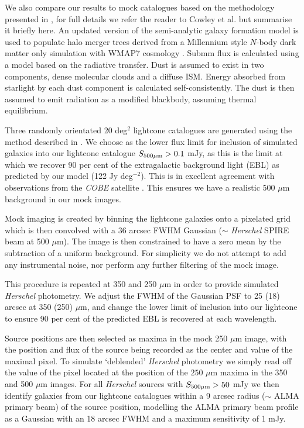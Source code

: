 We also compare our results to mock catalogues based on the methodology
presented in \cite{Cowley14}, for full details we refer the reader to Cowley et
al. but summarise it briefly here. An updated version of the \galform
\citep[e.g.][Lacey et al. in preparation]{Cole00} semi-analytic galaxy
formation model is used to populate halo merger trees
\citep[e.g.][]{PCH08,Jiang14} derived from a Millennium style $N$-body dark
matter only simulation \citep{Springel05,Guo13} with WMAP7 cosmology
\citep{Komatsu11}.  Submm flux is calculated using a model based on the
radiative transfer.  Dust is assumed to exist in two components,  dense
molecular clouds and a diffuse ISM.  Energy absorbed from starlight by each
dust component is calculated self-consistently. The dust is then assumed to
emit radiation as a modified blackbody, assuming thermal equilibrium.  

Three randomly orientated 20 deg$^2$ lightcone catalogues are generated using
the method described in \cite{Merson13}.  We choose as the lower flux limit for
inclusion of simulated galaxies into our lightcone catalogue
$S_{500\mu\rm{m}}>0.1$ mJy, as this is the limit at which we recover 90 per
cent of the extragalactic background light (EBL) as predicted by our model (122
Jy deg$^{-2}$). This is in excellent agreement with observations from the
\emph{COBE} satellite \citep[e.g.][]{Puget96,Fixsen98}. This ensures we have a
realistic 500 $\mu$m  background in our mock images.  

Mock imaging is created by binning the lightcone galaxies onto a pixelated grid
which is then convolved with a  36 arcsec FWHM Gaussian ($\sim$ \emph{Herschel}
SPIRE beam at 500 $\mu$m).  The image is then constrained to have a zero mean
by the subtraction of a uniform background.  For simplicity we do not attempt
to add any instrumental noise, nor perform any further filtering of the mock
image.  

This procedure is repeated at 350 and 250 $\mu$m in order to provide simulated
\emph{Herschel} photometry.  We adjust the FWHM of the Gaussian PSF to 25 (18)
arcsec at 350 (250) $\mu$m, and change the lower limit of inclusion into our
lightcone to ensure 90 per cent of the predicted EBL is recovered at each
wavelength.    

Source positions are then selected as maxima in the mock 250 $\mu$m image, with
the position and flux of the source being recorded as the center and value of
the maximal pixel.  To simulate `deblended' \emph{Herschel} photometry we
simply read off the value of the pixel located at the position of the $250$
$\mu$m maxima in the 350 and 500 $\mu$m images. For all \emph{Herschel} sources
with $S_{500\mu\rm{m}}>50$ mJy we then identify galaxies from our lightcone
catalogues within a 9 arcsec radius ($\sim$ ALMA primary beam) of the source
position, modelling the ALMA primary beam profile as a Gaussian with an 18
arcsec FWHM and a maximum sensitivity of 1 mJy.
